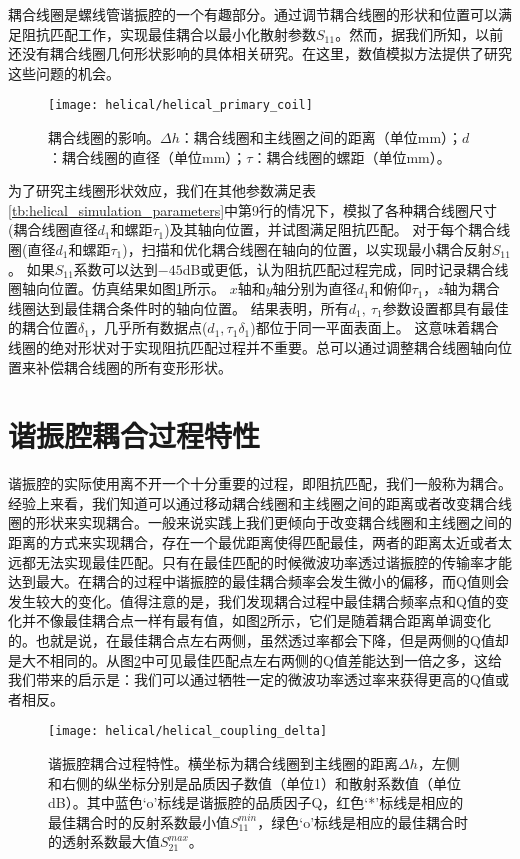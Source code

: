 耦合线圈是螺线管谐振腔的一个有趣部分。通过调节耦合线圈的形状和位置可以满足阻抗匹配工作，实现最佳耦合以最小化散射参数$S_{11}$。然而，据我们所知，以前还没有耦合线圈几何形状影响的具体相关研究。在这里，数值模拟方法提供了研究这些问题的机会。

\begin{figure}
    \centering
    \caption[耦合线圈的影响]{耦合线圈的影响。$\Delta h$：耦合线圈和主线圈之间的距离（单位mm）；$d$：耦合线圈的直径（单位mm）；$\tau$：耦合线圈的螺距（单位mm）。\label{fig:helical_primary_coil}}
    \texttt{[image: helical/helical\_primary\_coil]}
\end{figure}

为了研究主线圈形状效应，我们在其他参数满足表\ref{tb:helical_simulation_parameters}中第9行的情况下，模拟了各种耦合线圈尺寸(耦合线圈直径$d_1$和螺距$\tau_1$)及其轴向位置，并试图满足阻抗匹配。
对于每个耦合线圈(直径$d_1$和螺距$\tau_1$)，扫描和优化耦合线圈在轴向的位置，以实现最小耦合反射$S_{11}$。
如果$S_{11}$系数可以达到$-45$dB或更低，认为阻抗匹配过程完成，同时记录耦合线圈轴向位置。仿真结果如图\ref{fig:helical_primary_coil}所示。
$x$轴和$y$轴分别为直径$d_1$和俯仰$\tau_1$，$z$轴为耦合线圈达到最佳耦合条件时的轴向位置。
结果表明，所有$ d_1,\ \tau_1 $参数设置都具有最佳的耦合位置$ \delta_1$，几乎所有数据点($d_1,\tau_1\delta_1$)都位于同一平面表面上。
这意味着耦合线圈的绝对形状对于实现阻抗匹配过程并不重要。总可以通过调整耦合线圈轴向位置来补偿耦合线圈的所有变形形状。

\section{谐振腔耦合过程特性}
谐振腔的实际使用离不开一个十分重要的过程，即阻抗匹配，我们一般称为耦合。经验上来看，我们知道可以通过移动耦合线圈和主线圈之间的距离或者改变耦合线圈的形状来实现耦合。一般来说实践上我们更倾向于改变耦合线圈和主线圈之间的距离的方式来实现耦合，存在一个最优距离使得匹配最佳，两者的距离太近或者太远都无法实现最佳匹配。只有在最佳匹配的时候微波功率透过谐振腔的传输率才能达到最大。在耦合的过程中谐振腔的最佳耦合频率会发生微小的偏移，而Q值则会发生较大的变化。值得注意的是，我们发现耦合过程中最佳耦合频率点和Q值的变化并不像最佳耦合点一样有最有值，如图\ref{fig:helical_coupling_delta}所示，它们是随着耦合距离单调变化的。也就是说，在最佳耦合点左右两侧，虽然透过率都会下降，但是两侧的Q值却是大不相同的。从图\ref{fig:helical_coupling_delta}中可见最佳匹配点左右两侧的Q值差能达到一倍之多，这给我们带来的启示是：我们可以通过牺牲一定的微波功率透过率来获得更高的Q值或者相反。
\begin{figure}
    \centering
    \caption[谐振腔耦合过程特性]{谐振腔耦合过程特性。横坐标为耦合线圈到主线圈的距离$\Delta h$，左侧和右侧的纵坐标分别是品质因子数值（单位1）和散射系数值（单位dB）。其中蓝色‘o’标线是谐振腔的品质因子Q，红色‘*’标线是相应的最佳耦合时的反射系数最小值$S_{11}^{min}$，绿色‘o’标线是相应的最佳耦合时的透射系数最大值$S_{21}^{max}$。\label{fig:helical_coupling_delta}}
    \texttt{[image: helical/helical\_coupling\_delta]}
\end{figure}

